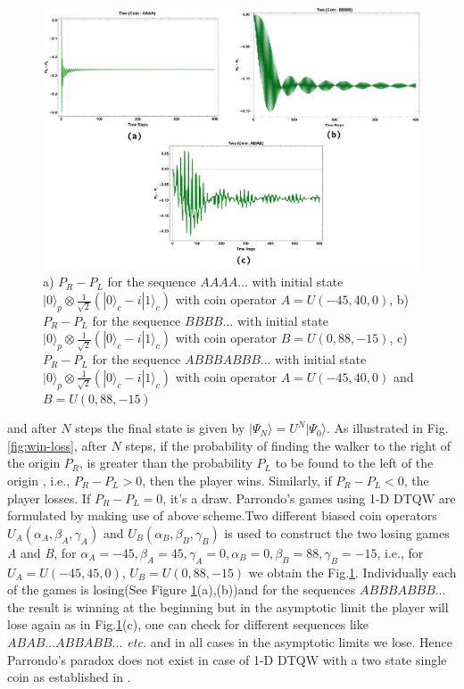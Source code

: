 \documentclass[english,aps,pra,amsmath,amssymb,showpacs,notitlepage,onecolumn]{revtex4-1}
\begin{document}
\begin{figure}[H]
\includegraphics[scale=0.55]{two_state.png}
 \caption{a) $P_R -P_L$ for the sequence $AAAA\ldots$ with initial state $| 0 \rangle_p \otimes \frac{1}{\sqrt{2}}(| 0 \rangle_c - i| 1 \rangle_c)$ with coin operator $A = U(-45, 40, 0)$,  b) $P_R -P_L$ for the sequence $BBBB\ldots$ with initial state $| 0 \rangle_p \otimes \frac{1}{\sqrt{2}}(| 0 \rangle_c - i| 1 \rangle_c)$ with coin operator $B = U(0, 88, -15)$, c) $P_R -P_L$ for the sequence $ABBBABBB\ldots$ with initial state $| 0 \rangle_p \otimes \frac{1}{\sqrt{2}}(| 0 \rangle_c - i| 1 \rangle_c)$ with coin operator $A = U(-45, 40, 0)$ and $B = U(0, 88, -15)$}\label{previous_result}
\end{figure}

and after $N$ steps the final state is given by $\vert\Psi_{N}\rangle=U^{N}\vert\Psi_{0}\rangle$. As illustrated in Fig. \ref{fig:win-loss}, after $N$ steps, if the probability of finding the walker to the right of the origin $P_{R}$, is greater than the probability $P_{L}$ to be found to the left of the origin , i.e., $P_{R}-P_{L}>0$, then the player wins. Similarly, if $P_{R}-P_{L}<0$, the player losses. If $P_{R}-P_{L}=0$, it's a draw. Parrondo's games using 1-D DTQW are formulated by making use of above scheme.Two different biased coin operators $U_{A} (\alpha_{A},\beta_{A},\gamma_{A})$ and $U_{B}(\alpha_{B},\beta_{B},\gamma_{B})$ is used to construct the two losing games \emph{A} and \emph{B}, for $\alpha_A=-45,\beta_{A}=45,\gamma_{A}=0,\alpha_{B}=0,\beta_{B}=88,\gamma_B=-15$, i.e., for $U_{A}=U(-45,45,0)$, $U_{B}=U(0,88,-15)$ we obtain the Fig.\ref{previous_result}. Individually each of the games is losing(See Figure \ref{previous_result}(a),(b))and for the sequences \emph{$ABBBABBB\ldots$} the result is winning at the beginning but in the asymptotic limit the player will lose again as in Fig.\ref{previous_result}(c), one can check for different sequences like \emph{$ABAB\ldots ABBABB\ldots$ etc.} and in all cases in the asymptotic limits we lose. Hence Parrondo's paradox does not exist in case of 1-D DTQW with a two state single coin as established in \cite{minli, flitney}. 
\end{document}
